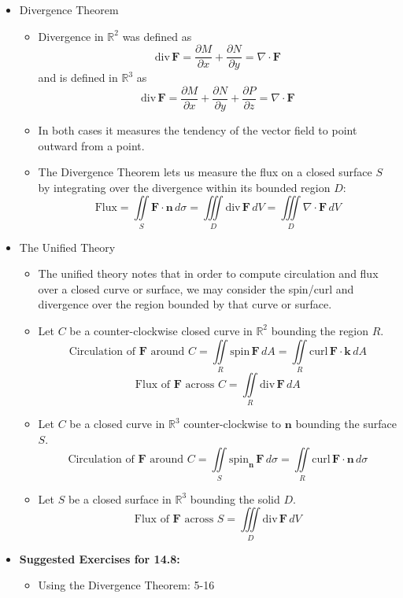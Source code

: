 \documentclass[12pt]{article}
\theoremstyle{plain}
\theoremstyle{definition}
\theoremstyle{remark}
\newcommand{\vect}[1]{\mathbf{#1}}
\newcommand{\veck}{\mathbf{k}}
\begin{document}
	\begin{itemize}
		
	\item Divergence Theorem
	
		\begin{itemize}
		\item Divergence in $\mathbb{R}^2$ was defined as \[ \textrm{div}\,\vect{F} = \frac{\partial M}{\partial x}+\frac{\partial N}{\partial y} = \nabla \cdot \vect{F} \] and is defined in $\mathbb{R}^3$ as \[\textrm{div}\,\vect{F} = \frac{\partial M}{\partial x}+\frac{\partial N}{\partial y}+\frac{\partial P}{\partial z} = \nabla \cdot \vect{F} \]
		\item In both cases it measures the tendency of the vector field to point outward from a point.
		\item The Divergence Theorem lets us measure the flux on a closed surface $S$ by integrating over the divergence within its bounded region $D$: \[\text{Flux} = \iint\limits_S \vect{F}\cdot\vect{n}\,d\sigma = \iiint\limits_D \textrm{div}\,\vect{F}\,dV= \iiint\limits_D \nabla\cdot\vect{F}\,dV\]
		\end{itemize}
		
	\item The Unified Theory
	
		\begin{itemize}
		\item The unified theory notes that in order to compute circulation and flux over a closed curve or surface, we may consider the spin/curl and divergence over the region bounded by that curve or surface.
		\item Let $C$ be a counter-clockwise closed curve in $\mathbb{R}^2$ bounding the region $R$.
			\[\text{Circulation of } \vect{F} \text{ around } C = \iint\limits_R \textrm{spin}\,\vect{F}\,dA = \iint\limits_R \textrm{curl}\,\vect{F}\cdot \veck\,dA\]
			\[\text{Flux of } \vect{F} \text{ across } C = \iint\limits_R \textrm{div}\,\vect{F}\,dA\]
		\item Let $C$ be a closed curve in $\mathbb{R}^3$ counter-clockwise to $\vect{n}$ bounding the surface $S$.
			\[\text{Circulation of } \vect{F} \text{ around } C = \iint\limits_S \textrm{spin}_{\vect{n}}\,\vect{F}\,d\sigma  = \iint\limits_R \textrm{curl}\,\vect{F}\cdot \vect{n}\,d\sigma\]
		\item Let $S$ be a closed surface in $\mathbb{R}^3$ bounding the solid $D$.
			\[\text{Flux of } \vect{F} \text{ across } S = \iiint\limits_D \textrm{div}\,\vect{F}\,dV\]
		\end{itemize}
				
	\item \textbf{Suggested Exercises for 14.8:}
	
		\begin{itemize}
		\item Using the Divergence Theorem: 5-16
		\end{itemize}
		
	\end{itemize}
\end{document}
